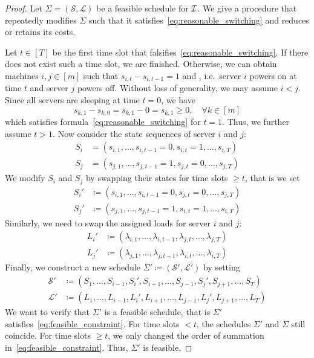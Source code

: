\begin{proof}
Let $\Sigma=(\mathcal{S},\mathcal{L})$ be a feasible schedule for $\mathcal{I}$. We give a procedure that repeatedly modifies $\Sigma$ such that it satisfies~\eqref{eq:reasonable_switching} and reduces or retains its costs. 
	
Let $t\in[T]$ be the first time slot that falsifies~\eqref{eq:reasonable_switching}. If there does not exist such a time slot, we are finished. Otherwise, we can obtain machines $i,j\in[m]$ such that $s_{i,t}-s_{i,t-1}=1$ and , i.e.\ server $i$ powers on at time $t$ and server $j$ powers off. Without loss of generality, we may assume $i<j$. Since all servers are sleeping at time $t=0$, we have
\begin{equation*}
	s_{k,1}-s_{k,0}=s_{k,1}-0=s_{k,1}\ge 0,\quad\forall k\in[m]
\end{equation*}
which satisfies formula~\eqref{eq:reasonable_switching} for $t=1$. Thus, we further assume $t>1$. Now consider the state sequences of server $i$ and $j$:
\begin{align*}
	S_i&=(s_{i,1},\ldots,s_{i,t-1}=0,s_{i,t}=1,\ldots,s_{i,T})\\
	S_j&=(s_{j,1},\ldots,s_{j,t-1}=1,s_{j,t}=0,\ldots,s_{j,T})
\end{align*}
We modify $S_i$ and $S_j$ by swapping their states for time slots $\ge t$, that is we set
\begin{align*}
	S_i'&\coloneqq(s_{i,1},\ldots,s_{i,t-1}=0,s_{j,t}=0,\ldots,s_{j,T})\\
	S_j'&\coloneqq(s_{j,1},\ldots,s_{j,t-1}=1,s_{i,t}=1,\ldots,s_{i,T})
\end{align*}
Similarly, we need to swap the assigned loads for server $i$ and $j$:
\begin{align*}
	L_i'&\coloneqq(\lambda_{i,1},\ldots,\lambda_{i,t-1},\lambda_{j,t},\ldots,\lambda_{j,T})\\
	L_j'&\coloneqq(\lambda_{j,1},\ldots,\lambda_{j,t-1},\lambda_{i,t},\ldots,\lambda_{i,T})
\end{align*}
Finally, we construct a new schedule $\Sigma'\coloneqq(\mathcal{S}',\mathcal{L}')$ by setting
\begin{align*}
	\mathcal{S}'&\coloneqq(S_1,\ldots,S_{i-1},S_i',S_{i+1},\ldots,S_{j-1},S_j',S_{j+1},\ldots,S_T)\\
	\mathcal{L}'&\coloneqq(L_1,\ldots,L_{i-1},L_i',L_{i+1},\ldots,L_{j-1},L_j',L_{j+1},\ldots,L_T)
\end{align*}
We want to verify that $\Sigma'$ is a feasible schedule, that is $\Sigma'$ satisfies~\eqref{eq:feasible_constraint}. For time slots $<t$, the schedules $\Sigma'$ and $\Sigma$ still coincide. For time slots $\ge t$, we only changed the order of summation in~\eqref{eq:feasible_constraint}. Thus, $\Sigma'$ is feasible.


\end{proof}
